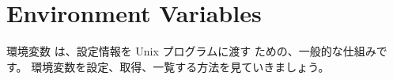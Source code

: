 \section{Environment Variables}

環境変数 は、設定情報を Unix プログラムに渡す ための、一般的な仕組みです。 環境変数を設定、取得、一覧する方法を見ていきましょう。




